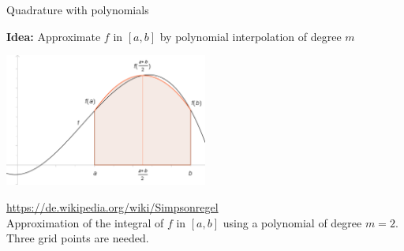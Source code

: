









\begin{vbframe}{Quadrature with polynomials}

\textbf{Idea:} Approximate $f$ in $[a, b]$ by polynomial interpolation of degree $m$

\begin{center}
\includegraphics[width=0.5\textwidth]{figure_man/newton_cotes_2.png}
\begin{footnotesize}
\url{https://de.wikipedia.org/wiki/Simpsonregel}\\
Approximation of the integral of $f$ in $[a, b]$ using a polynomial of degree $m = 2$. Three grid points are needed.
\end{footnotesize}
\end{center}

\end{vbframe}

